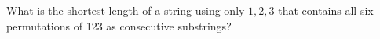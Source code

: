 What is the shortest length of a string using only $1,2,3$ that contains all six permutations of 123 as consecutive substrings?
